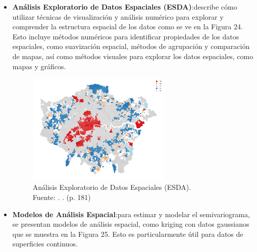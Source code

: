\begin{itemize}
	\item \textbf{Análisis Exploratorio de Datos Espaciales (ESDA)}:describe cómo utilizar técnicas de visualización y análisis numérico para explorar y comprender la estructura espacial de los datos como se ve en la Figura 24. Esto incluye métodos numéricos para identificar propiedades de los datos espaciales, como suavización espacial, métodos de agrupación y comparación de mapas, así como métodos visuales para explorar los datos espaciales, como mapas y gráficos. \parencite{bk_haining2003spdat}
	
	\begin{figure}[h]
		\begin{center}
			\includegraphics[width=0.65\textwidth]{2/figures/esda.png}
			\caption[Análisis Exploratorio de Datos Espaciales (ESDA)]{Análisis Exploratorio de Datos Espaciales (ESDA).\\
			Fuente: \cite{bk_haining2003spdat}. . (p. 181)}
			\label{2:fig10}
		\end{center}
	\end{figure}
		

	\item \textbf{Modelos de Análisis Espacial}:para estimar y modelar el semivariograma, se presentan modelos de análisis espacial, como kriging con datos gaussianos que se muestra en la Figura 25. Esto es particularmente útil para datos de superficies continuos. \parencite{bk_haining2003spdat}
	

\end{itemize}

